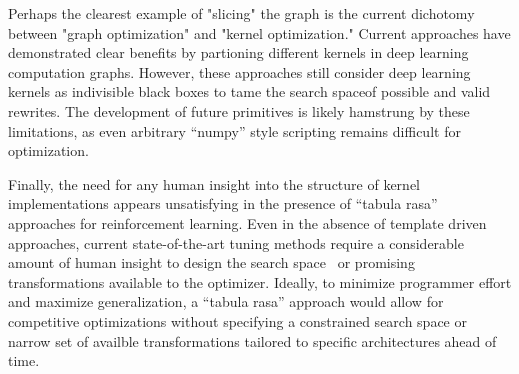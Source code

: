 Perhaps the clearest example of "slicing" the graph is the current dichotomy between "graph optimization" and "kernel optimization."
Current approaches have demonstrated clear benefits by partioning different kernels in deep learning computation graphs.
However, these approaches still consider deep learning kernels as indivisible black boxes to tame the search spaceof possible and valid rewrites.
The development of future primitives is likely hamstrung by these limitations, as even arbitrary ``numpy'' style scripting remains difficult for optimization.

Finally, the need for any human insight into the structure of kernel implementations appears unsatisfying in the presence of ``tabula rasa''~\cite{silver2017mastering} approaches for reinforcement learning.
Even in the absence of template driven approaches, current state-of-the-art tuning methods require a considerable amount of human insight to design the search space~\cite{zheng2020ansor} or promising transformations available to the optimizer.
Ideally, to minimize programmer effort and maximize generalization, a ``tabula rasa'' approach would allow for competitive optimizations without specifying a constrained search space or narrow set of availble transformations tailored to specific architectures ahead of time.
